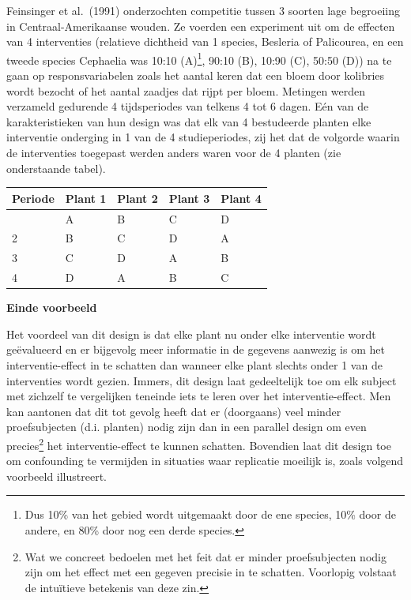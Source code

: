 \documentclass[
  dutch,
  letterpaper,
  12pt]{book}
\newcounter{none} %
\theoremstyle{definition}
\theoremstyle{definition}
\theoremstyle{definition}
\theoremstyle{remark}
\begin{document}
Feinsinger et al.~(1991) onderzochten competitie tussen 3 soorten lage
begroeiing in Centraal-Amerikaanse wouden. Ze voerden een experiment uit
om de effecten van 4 interventies (relatieve dichtheid van 1 species,
Besleria of Palicourea, en een tweede species Cephaelia was 10:10
(A)\footnote{Dus 10\% van het gebied wordt uitgemaakt door de ene
  species, 10\% door de andere, en 80\% door nog een derde species.},
90:10 (B), 10:90 (C), 50:50 (D)) na te gaan op responsvariabelen zoals
het aantal keren dat een bloem door kolibries wordt bezocht of het
aantal zaadjes dat rijpt per bloem. Metingen werden verzameld gedurende
4 tijdsperiodes van telkens 4 tot 6 dagen. Eén van de karakteristieken
van hun design was dat elk van 4 bestudeerde planten elke interventie
onderging in 1 van de 4 studieperiodes, zij het dat de volgorde waarin
de interventies toegepast werden anders waren voor de 4 planten (zie
onderstaande tabel).

{\def\LTcaptype{none} %
\begin{longtable}[]{@{}lllll@{}}
\toprule\noalign{}
Periode & Plant 1 & Plant 2 & Plant 3 & Plant 4 \\
\midrule\noalign{}
\endhead
\bottomrule\noalign{}
\endlastfoot
1 & A & B & C & D \\
2 & B & C & D & A \\
3 & C & D & A & B \\
4 & D & A & B & C \\
\end{longtable}
}

\textbf{Einde voorbeeld}

Het voordeel van dit design is dat elke plant nu onder elke interventie
wordt geëvalueerd en er bijgevolg meer informatie in de gegevens
aanwezig is om het interventie-effect in te schatten dan wanneer elke
plant slechts onder 1 van de interventies wordt gezien. Immers, dit
design laat gedeeltelijk toe om elk subject met zichzelf te vergelijken
teneinde iets te leren over het interventie-effect. Men kan aantonen dat
dit tot gevolg heeft dat er (doorgaans) veel minder proefsubjecten (d.i.
planten) nodig zijn dan in een parallel design om even
precies\footnote{Wat we concreet bedoelen met het feit dat er minder
  proefsubjecten nodig zijn om het effect met een gegeven precisie in te
  schatten. Voorlopig volstaat de intuïtieve betekenis van deze zin.}
het interventie-effect te kunnen schatten. Bovendien laat dit design toe
om confounding te vermijden in situaties waar replicatie moeilijk is,
zoals volgend voorbeeld illustreert.
\end{document}
